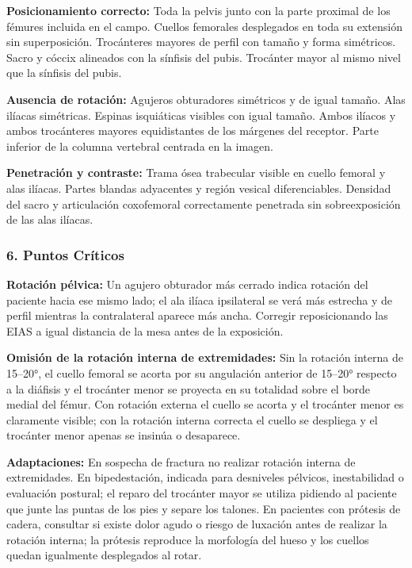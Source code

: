 	\textbf{Posicionamiento correcto:} Toda la pelvis junto con la parte proximal de los fémures incluida en el campo. Cuellos femorales desplegados en toda su extensión sin superposición. Trocánteres mayores de perfil con tamaño y forma simétricos. Sacro y cóccix alineados con la sínfisis del pubis. Trocánter mayor al mismo nivel que la sínfisis del pubis.
	
	\textbf{Ausencia de rotación:} Agujeros obturadores simétricos y de igual tamaño. Alas ilíacas simétricas. Espinas isquiáticas visibles con igual tamaño. Ambos ilíacos y ambos trocánteres mayores equidistantes de los márgenes del receptor. Parte inferior de la columna vertebral centrada en la imagen.
	
	\textbf{Penetración y contraste:} Trama ósea trabecular visible en cuello femoral y alas ilíacas. Partes blandas adyacentes y región vesical diferenciables. Densidad del sacro y articulación coxofemoral correctamente penetrada sin sobreexposición de las alas ilíacas.
	
	\subsubsection*{6. Puntos Críticos}
	
	\textbf{Rotación pélvica:} Un agujero obturador más cerrado indica rotación del paciente hacia ese mismo lado; el ala ilíaca ipsilateral se verá más estrecha y de perfil mientras la contralateral aparece más ancha. Corregir reposicionando las EIAS a igual distancia de la mesa antes de la exposición.
	
	\textbf{Omisión de la rotación interna de extremidades:} Sin la rotación interna de 15--20°, el cuello femoral se acorta por su angulación anterior de 15--20° respecto a la diáfisis y el trocánter menor se proyecta en su totalidad sobre el borde medial del fémur. Con rotación externa el cuello se acorta y el trocánter menor es claramente visible; con la rotación interna correcta el cuello se despliega y el trocánter menor apenas se insinúa o desaparece.
	
	\textbf{Adaptaciones:} En sospecha de fractura no realizar rotación interna de extremidades. En bipedestación, indicada para desniveles pélvicos, inestabilidad o evaluación postural; el reparo del trocánter mayor se utiliza pidiendo al paciente que junte las puntas de los pies y separe los talones. En pacientes con prótesis de cadera, consultar si existe dolor agudo o riesgo de luxación antes de realizar la rotación interna; la prótesis reproduce la morfología del hueso y los cuellos quedan igualmente desplegados al rotar.
	
